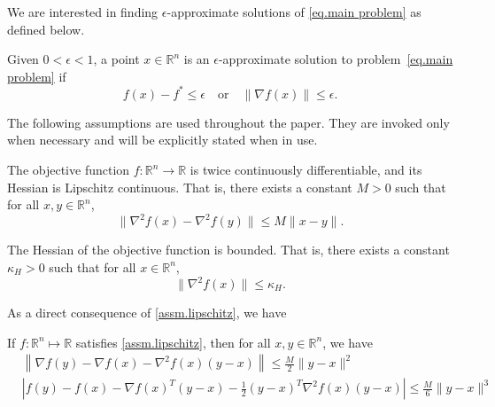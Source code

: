 \documentclass{article}
\begin{document}
We are interested in finding $\epsilon$-approximate solutions of \eqref{eq.main problem} as defined below.
\begin{definition}
    \label{def.approximate solution}
    Given $0<\epsilon <1$, a point $x \in \mathbb{R}^n$ is an $\epsilon$-approximate solution to problem~\eqref{eq.main problem} if
    \begin{equation}
        \label{eq.approximate solution}
        f(x) - f^* \leq \epsilon \quad \text{or} \quad \|\nabla f(x)\| \leq \epsilon.
    \end{equation}
\end{definition}
The following assumptions are used throughout the paper. They are invoked only when necessary and will be explicitly stated when in use.
\begin{assumption}
    \label{assm.lipschitz}
    The objective function $f: \mathbb{R}^n \to \mathbb{R}$ is twice continuously differentiable, and its Hessian is Lipschitz continuous. That is, there exists a constant $M > 0$ such that for all $x, y \in \mathbb{R}^n$,
    \begin{equation}
        \label{eq.main assm}
        \|\nabla^2 f(x) - \nabla^2 f(y)\| \leq M \|x - y\|. \end{equation}
\end{assumption}
\begin{assumption}
    \label{assm.bounded hessian}
    The Hessian of the objective function is bounded. That is, there exists a constant $\kappa_H > 0$ such that for all $x \in \mathbb{R}^n$, \begin{equation}
        \label{eq.bounded hessian}
        \|\nabla^2 f(x)\| \leq \kappa_H.
    \end{equation} \end{assumption}
As a direct consequence of \autoref{assm.lipschitz}, we have
\begin{lemma}\label{lem.lipschitz}
    If \(f:\mathbb{R}^n \mapsto \mathbb{R}\) satisfies \autoref{assm.lipschitz}, then for all \(x,y\in \mathbb{R}^n\), we have
    \begin{subequations}
        \begin{align}
            \label{eq.first-order exp}
             & \left\|\nabla f(y)-\nabla f(x)-\nabla^{2} f(x)(y-x)\right\|                       \leq \frac{M}{2}\|y-x\|^{2} \\
            \label{eq.second-order exp}
             & \left|f(y)-f(x)-\nabla f(x)^T(y-x)-\frac{1}{2}(y-x)^T\nabla^{2} f(x)(y-x)\right|  \leq \frac{M}{6}\|y-x\|^{3}
        \end{align}
    \end{subequations}
\end{lemma}
\end{document}
